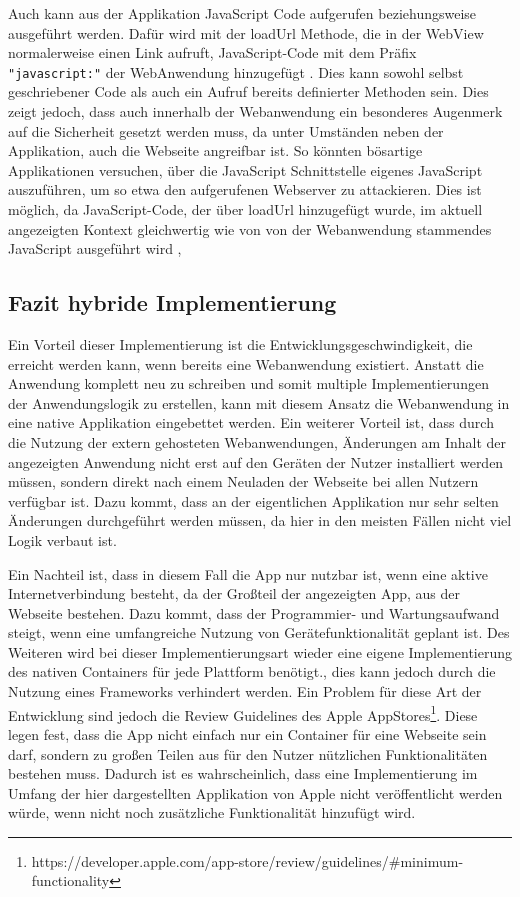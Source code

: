 Auch kann aus der Applikation JavaScript Code aufgerufen beziehungsweise ausgeführt werden. Dafür wird mit der loadUrl Methode, die in der WebView normalerweise einen Link aufruft, JavaScript-Code mit dem Präfix \verb|"javascript:"| der WebAnwendung hinzugefügt \cite{webview_javascript_security}. Dies kann sowohl selbst geschriebener Code als auch ein Aufruf bereits definierter Methoden sein. Dies zeigt jedoch, dass auch innerhalb der Webanwendung ein besonderes Augenmerk auf die Sicherheit gesetzt werden muss, da unter Umständen neben der Applikation, auch die Webseite angreifbar ist. So könnten bösartige Applikationen versuchen, über die JavaScript Schnittstelle eigenes JavaScript auszuführen, um so etwa den aufgerufenen Webserver zu attackieren. Dies ist möglich, da JavaScript-Code, der über loadUrl hinzugefügt wurde, im aktuell angezeigten Kontext gleichwertig wie von von der Webanwendung stammendes JavaScript ausgeführt wird \cite{webview_javascript_security},

\subsection{Fazit hybride Implementierung}
Ein Vorteil dieser Implementierung ist die Entwicklungsgeschwindigkeit, die erreicht werden kann, wenn bereits eine Webanwendung existiert. Anstatt die Anwendung komplett neu zu schreiben und somit multiple Implementierungen der Anwendungslogik zu erstellen, kann mit diesem Ansatz die Webanwendung in eine native Applikation eingebettet werden.
Ein weiterer Vorteil ist, dass durch die Nutzung der extern gehosteten Webanwendungen, Änderungen am Inhalt der angezeigten Anwendung nicht erst auf den Geräten der Nutzer installiert werden müssen, sondern direkt nach einem Neuladen der Webseite bei allen Nutzern verfügbar ist. 
Dazu kommt, dass an der eigentlichen Applikation nur sehr selten Änderungen durchgeführt werden müssen, da hier in den meisten Fällen nicht viel Logik verbaut ist.

Ein Nachteil ist, dass in diesem Fall die App nur nutzbar ist, wenn eine aktive Internetverbindung besteht, da der Großteil der angezeigten App, aus der Webseite bestehen. Dazu kommt, dass der Programmier- und Wartungsaufwand steigt, wenn eine umfangreiche Nutzung von Gerätefunktionalität geplant ist. Des Weiteren wird bei dieser Implementierungsart wieder eine eigene Implementierung des nativen Containers für jede Plattform benötigt., dies kann jedoch durch die Nutzung eines Frameworks verhindert werden. Ein Problem für diese Art der Entwicklung sind jedoch die Review Guidelines des Apple AppStores\footnote{https://developer.apple.com/app-store/review/guidelines/\#minimum-functionality}. Diese legen fest, dass die App nicht einfach nur ein Container für eine Webseite sein darf, sondern zu großen Teilen aus für den Nutzer nützlichen Funktionalitäten bestehen muss. Dadurch ist es wahrscheinlich, dass eine Implementierung im Umfang der hier dargestellten Applikation von Apple nicht veröffentlicht werden würde, wenn nicht noch zusätzliche Funktionalität hinzufügt wird.

